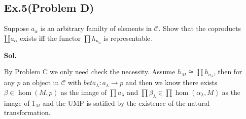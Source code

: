 \documentclass[lang=en,11pt,a4paper,citestyle =authoryear]{elegantpaper}
\begin{document}
\subsection*{Ex.5(Problem D)} 
Suppose $a_{\alpha}$ is an arbitrary familty of elements in $\mathcal{C}$. Show that the coproducts $\amalg a_{\alpha}$ exists iff the functor $\prod h_{a_{\alpha}}$ is representable.
\vspace{0.5em}\par
\textbf{Sol.} \par
By Problem C we only need check the necessity. Assume $h_M \cong \prod h_{a_{\lambda}}$, then for any $p$ an object in $\mathcal{C}$ with $beta_{\lambda}:a_{\lambda} \to p$ and then we know there exists $\beta \in \hom(M,p)$ as the image of $\prod a_{\lambda}$ and $\prod \beta_{\lambda} \in \prod \hom(\alpha_{\lambda},M)$ as the image of $1_M$ and the UMP is satified by the existence of the natural transformation.
\par 
\vspace{0.5em}

\addappheadtotoc
\end{document}
